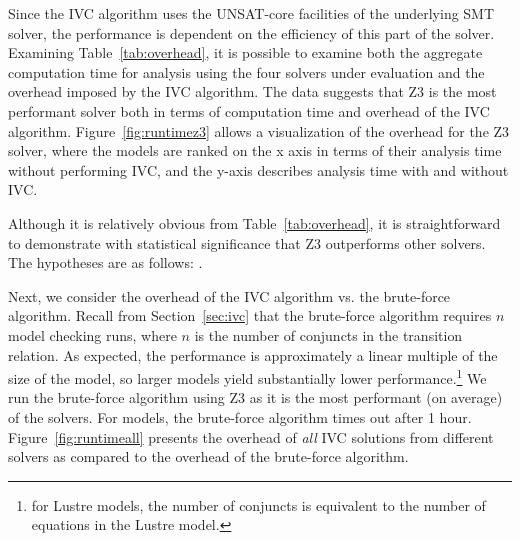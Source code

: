 Since the IVC algorithm uses the UNSAT-core facilities of the underlying SMT solver, the performance is dependent on the efficiency of this part of the solver.  Examining Table~\ref{tab:overhead}, it is possible to examine both the aggregate computation time for analysis using the four solvers under evaluation and the overhead imposed by the IVC algorithm.  The data suggests that Z3 is the most performant solver both in terms of computation time and overhead of the IVC algorithm.  Figure~\ref{fig:runtimez3} allows a visualization of the overhead for the Z3 solver, where the models are ranked on the x axis in terms of their analysis time without performing IVC, and the y-axis describes analysis time with and without IVC.  


Although it is relatively obvious from Table~\ref{tab:overhead}, it is straightforward to demonstrate with statistical significance that Z3 outperforms other solvers.  The hypotheses are as follows: .


Next, we consider the overhead of the IVC algorithm vs. the brute-force algorithm.  Recall from Section~\ref{sec:ivc} that the brute-force algorithm requires $n$ model checking runs, where $n$ is the number of conjuncts in the transition relation. As expected, the performance is approximately a linear multiple of the size of the model, so larger models yield substantially lower performance.\footnote{for Lustre models, the number of conjuncts is equivalent to the number of equations in the Lustre model.}  We run the brute-force algorithm using Z3 as it is the most performant (on average) of the solvers.  For  models, the brute-force algorithm times out after 1 hour.   Figure~\ref{fig:runtimeall} presents the overhead of {\em all} IVC solutions from different solvers as compared to the overhead of the brute-force algorithm.


